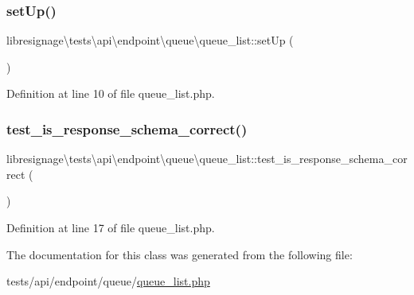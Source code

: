 \subsubsection{\texorpdfstring{set\+Up()}{setUp()}}
{\footnotesize\ttfamily libresignage\textbackslash{}tests\textbackslash{}api\textbackslash{}endpoint\textbackslash{}queue\textbackslash{}queue\+\_\+list\+::set\+Up (\begin{DoxyParamCaption}{ }\end{DoxyParamCaption})}



Definition at line 10 of file queue\+\_\+list.\+php.

\mbox{\label{classlibresignage_1_1tests_1_1api_1_1endpoint_1_1queue_1_1queue__list_abab7ebb5536bb477a2338483b67d4d0a}} 
\subsubsection{\texorpdfstring{test\+\_\+is\+\_\+response\+\_\+schema\+\_\+correct()}{test\_is\_response\_schema\_correct()}}
{\footnotesize\ttfamily libresignage\textbackslash{}tests\textbackslash{}api\textbackslash{}endpoint\textbackslash{}queue\textbackslash{}queue\+\_\+list\+::test\+\_\+is\+\_\+response\+\_\+schema\+\_\+correct (\begin{DoxyParamCaption}{ }\end{DoxyParamCaption})}



Definition at line 17 of file queue\+\_\+list.\+php.



The documentation for this class was generated from the following file\+:\begin{DoxyCompactItemize}
\item 
tests/api/endpoint/queue/\hyperlink{tests_2api_2endpoint_2queue_2queue__list_8php}{queue\+\_\+list.\+php}\end{DoxyCompactItemize}
